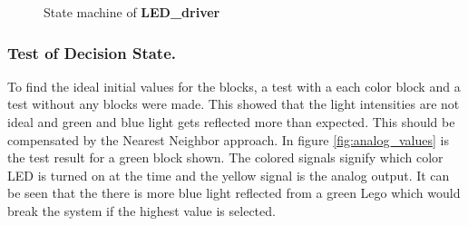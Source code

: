 \begin{figure}[h]
\centering
 \caption{State machine of \textbf{LED\_driver}}
 \label{fig::state_led}
\end{figure}

\subsubsection{Test of Decision State.}\label{sec:system_test}
To find the ideal initial values for the blocks, a test with a each color block and a test without any blocks were made.
This showed that the light intensities are not ideal and green and blue light gets reflected more than expected.
This should be compensated by the Nearest Neighbor approach.
In figure \ref{fig:analog_values} is the test result for a green block shown.
The colored signals signify which color LED is turned on at the time and the yellow signal is the analog output.
It can be seen that the there is more blue light reflected from a green Lego which would break the system if the highest value is selected.

